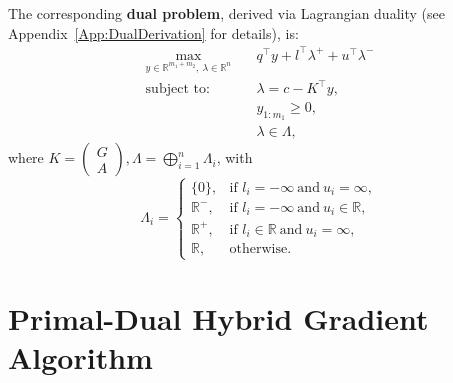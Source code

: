 \documentclass[twoside,12pt,openright]{report}  %
\begin{document}
The corresponding \textbf{dual problem}, derived via Lagrangian duality (see  Appendix~\ref{App:DualDerivation} for details), is:
\[
\begin{aligned}
    \max_{y \in \mathbb{R}^{m_1+m_2}, \ \lambda \in \mathbb{R}^n} \quad & q^\top y + l^\top \lambda^+ + u^\top \lambda^- \\
    \text{subject to:} \quad & \lambda = c - K^\top y, \\
    & y_{1:m_1} \ge 0, \\
    & \lambda \in \Lambda,
\end{aligned}
\]
where $ K=\begin{pmatrix}
    G\\A
\end{pmatrix},  \Lambda = \bigoplus_{i=1}^{n} \Lambda_i$, with
\[
\Lambda_i =
\begin{cases}
\{0\}, & \text{if } l_i = -\infty \ \text{and} \ u_i = \infty, \\[0.3em]
\mathbb{R}^-, & \text{if } l_i = -\infty \ \text{and} \ u_i \in \mathbb{R}, \\[0.3em]
\mathbb{R}^+, & \text{if } l_i \in \mathbb{R} \ \text{and} \ u_i = \infty, \\[0.3em]
\mathbb{R}, & \text{otherwise}.
\end{cases}
\]

\section{Primal-Dual Hybrid Gradient Algorithm}\label{sec:initial_solver}

\end{document}
